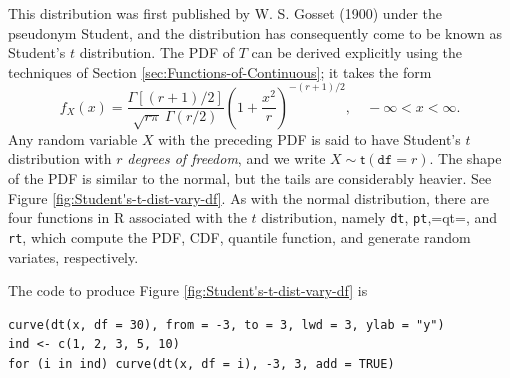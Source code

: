 \documentclass[captions=tableheading]{scrbook}
\begin{document}
This distribution was first published by W. S. Gosset (1900) under the pseudonym Student, and the distribution has consequently come to be known as Student's \(t\) distribution. The PDF of \(T\) can be derived explicitly using the techniques of Section \ref{sec:Functions-of-Continuous}; it takes the form 
\begin{equation}
f_{X}(x)=\frac{\Gamma[(r+1)/2]}{\sqrt{r\pi}\ \Gamma(r/2)}\left(1+\frac{x^{2}}{r}\right)^{-(r+1)/2},\quad-\infty<x<\infty.
\end{equation}
Any random variable \(X\) with the preceding PDF is said to have Student's \(t\) distribution with \(r\) \emph{degrees of freedom}, and we write \(X\sim\mathsf{t}(\mathtt{df}=r)\). The shape of the PDF is similar to the normal, but the tails are considerably heavier. See Figure \ref{fig:Student's-t-dist-vary-df}. As with the normal distribution, there are four functions in \textsf{R} associated with the \(t\) distribution, namely \texttt{dt}, \texttt{pt},=qt=, and \texttt{rt}, which compute the PDF, CDF, quantile function, and generate random variates, respectively.


The code to produce Figure \ref{fig:Student's-t-dist-vary-df} is


\begin{verbatim}
curve(dt(x, df = 30), from = -3, to = 3, lwd = 3, ylab = "y")
ind <- c(1, 2, 3, 5, 10)
for (i in ind) curve(dt(x, df = i), -3, 3, add = TRUE)
\end{verbatim}
\end{document}
